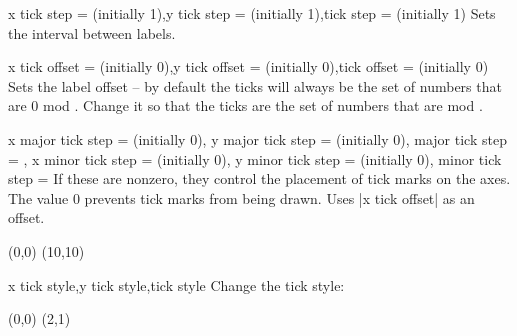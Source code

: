 \begin{sseqdata}[name = basic, cohomological Serre grading]
\begin{keylist}{x tick step =  (initially 1),y tick step =  (initially 1),tick step =  (initially 1)}
Sets the interval between labels.
\end{keylist}

\begin{keylist}{x tick offset =  (initially 0),y tick offset =  (initially 0),tick offset =  (initially 0)}%
Sets the label offset -- by default the ticks will always be the set of numbers
that are 0 mod . Change it so that the ticks are the set of
numbers that are  mod .
\end{keylist}

\begin{keylist}{
    x major tick step =  (initially 0),
    y major tick step =  (initially 0),
    major tick step = ,
    x minor tick step =  (initially 0),
    y minor tick step =  (initially 0),
    minor tick step = %
}%
If these are nonzero, they control the placement of tick marks on the axes. The
value 0 prevents tick marks from being drawn. Uses |x tick offset| as an offset.
\begin{codeexample}[width=7cm]
\begin{sseqpage}[
    tick step = 5,
    major tick step = 5,
    minor tick step = 1,
    scale = 0.4,
    axes type = frame
]
\class(0,0)
\class(10,10)
\end{sseqpage}
\end{codeexample}
\end{keylist}

\begin{stylekeylist}{x tick style,y tick style,tick style}
Change the tick style:
\begin{codeexample}[width = 7cm]
\begin{sseqpage}[ tick style = { blue, font = \tiny } ]
\class(0,0) \class(2,1)
\end{sseqpage}
\end{codeexample}
\end{stylekeylist}


\end{sseqdata}
